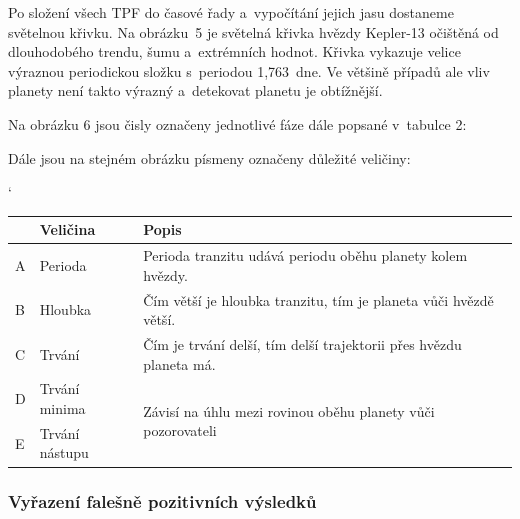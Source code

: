 \documentclass[a4paper,12pt]{article}
\begin{document}
{Po složení všech TPF do časové řady a~vypočítání jejich jasu dostaneme světelnou křivku. Na obrázku~5 je světelná křivka hvězdy Kepler-13 očištěná od dlouhodobého trendu, šumu a~extrémních hodnot. Křivka vykazuje velice výraznou periodickou složku s~periodou 1,763~dne. Ve většině případů ale vliv planety není takto výrazný a~detekovat planetu je obtížnější.


Na obrázku 6 jsou čisly označeny jednotlivé fáze dále popsané v~tabulce 2:

{

Dále jsou na stejném obrázku písmeny označeny důležité veličiny:

{\catcode` {
\begin{tabular}{|ll|l|}
    \hline
    \rowcolor{lightgray}
     & Veličina & Popis \\
     \hline
     A & Perioda & Perioda tranzitu udává periodu oběhu planety kolem hvězdy. \\
     \hline
     B & Hloubka & Čím větší je hloubka tranzitu, tím je planeta vůči hvězdě větší. \\
     \hline
     C & Trvání & Čím je trvání delší, tím delší trajektorii přes hvězdu planeta má. \\ 
     \hline
     D & Trvání minima & \multirow{2}{*}{Závisí na úhlu mezi rovinou oběhu planety vůči pozorovateli} \\
     \cline{1-2}
     E & Trvání nástupu & \\
     \hline
\end{tabular}
}}

\subsubsection{Vyřazení falešně pozitivních výsledků}

}}
\end{document}

